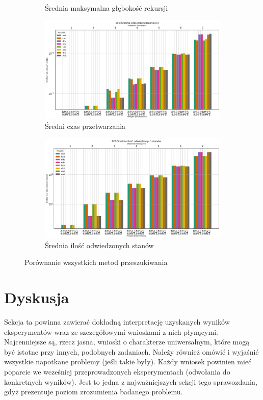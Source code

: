 \documentclass{classrep}
\begin{document}
\begin{figure}[H]
\begin{subfigure}[t]{\textwidth}
        \caption{Średnia maksymalna głębokość rekursji}
        \label{BFS:rescursed}
    \end{subfigure}
    \begin{subfigure}[t]{\textwidth}
        \includegraphics[width=\textwidth]{charts/BFS_time.png}
        \caption{Średni czas przetwarzania}
        \label{BFS:time}
    \end{subfigure}
    \begin{subfigure}[t]{\textwidth}
        \includegraphics[width=\textwidth]{charts/BFS_visited.png}
        \caption{Średnia ilość odwiedzonych stanów}
        \label{BFS:visited}
    \end{subfigure}
    \caption{Porównanie wszystkich metod przeszukiwania}\label{fig:animals}
\end{figure}

\section{Dyskusja}
{\color{blue}
Sekcja ta powinna zawierać dokładną interpretację uzyskanych wyników
eksperymentów wraz ze szczegółowymi wnioskami z nich płynącymi. Najcenniejsze
są, rzecz jasna, wnioski o charakterze uniwersalnym, które mogą być istotne
przy innych, podobnych zadaniach. Należy również omówić i wyjaśnić wszystkie
napotkane problemy (jeśli takie były). Każdy wniosek powinien mieć poparcie we
wcześniej przeprowadzonych eksperymentach (odwołania do konkretnych wyników).
Jest to jedna z najważniejszych sekcji tego sprawozdania, gdyż prezentuje
poziom zrozumienia badanego problemu.}
\end{document}
